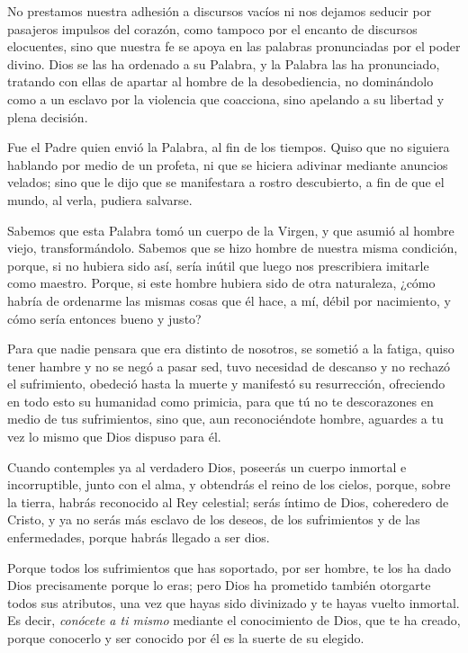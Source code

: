 \documentclass[]{article}
\begin{document}
No prestamos nuestra adhesión a discursos vacíos ni nos dejamos seducir
por pasajeros impulsos del corazón, como tampoco por el encanto de
discursos elocuentes, sino que nuestra fe se apoya en las palabras
pronunciadas por el poder divino. Dios se las ha ordenado a su Palabra,
y la Palabra las ha pronunciado, tratando con ellas de apartar al hombre
de la desobediencia, no dominándolo como a un esclavo por la violencia
que coacciona, sino apelando a su libertad y plena decisión.

Fue el Padre quien envió la Palabra, al fin de los tiempos. Quiso que no
siguiera hablando por medio de un profeta, ni que se hiciera adivinar
mediante anuncios velados; sino que le dijo que se manifestara a rostro
descubierto, a fin de que el mundo, al verla, pudiera salvarse.

Sabemos que esta Palabra tomó un cuerpo de la Virgen, y que asumió al
hombre viejo, transformándolo. Sabemos que se hizo hombre de nuestra
misma condición, porque, si no hubiera sido así, sería inútil que luego
nos prescribiera imitarle como maestro. Porque, si este hombre hubiera
sido de otra naturaleza, ¿cómo habría de ordenarme las mismas cosas que
él hace, a mí, débil por nacimiento, y cómo sería entonces bueno y
justo?

Para que nadie pensara que era distinto de nosotros, se sometió a la
fatiga, quiso tener hambre y no se negó a pasar sed, tuvo necesidad de
descanso y no rechazó el sufrimiento, obedeció hasta la muerte y
manifestó su resurrección, ofreciendo en todo esto su humanidad como
primicia, para que tú no te descorazones en medio de tus sufrimientos,
sino que, aun reconociéndote hombre, aguardes a tu vez lo mismo que Dios
dispuso para él.

Cuando contemples ya al verdadero Dios, poseerás un cuerpo inmortal e
incorruptible, junto con el alma, y obtendrás el reino de los cielos,
porque, sobre la tierra, habrás reconocido al Rey celestial; serás
íntimo de Dios, coheredero de Cristo, y ya no serás más esclavo de los
deseos, de los sufrimientos y de las enfermedades, porque habrás llegado
a ser dios.

Porque todos los sufrimientos que has soportado, por ser hombre, te los
ha dado Dios precisamente porque lo eras; pero Dios ha prometido también
otorgarte todos sus atributos, una vez que hayas sido divinizado y te
hayas vuelto inmortal. Es decir, \emph{conócete a ti mismo} mediante el
conocimiento de Dios, que te ha creado, porque conocerlo y ser conocido
por él es la suerte de su elegido.
\end{document}
